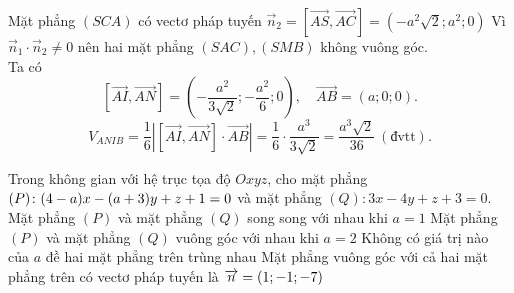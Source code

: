 \begin{ex}
{\begin{itemchoice}
			Mặt phẳng $(SCA)$ có vectơ pháp  tuyến $\overrightarrow{n}_2 = [\overrightarrow{AS},\overrightarrow{AC}] = (-a^2\sqrt{2};a^2;0)$
			\itemch Vì  $\overrightarrow{n}_1 \cdot \overrightarrow{n}_2 \ne 0$ nên hai mặt phẳng $(SAC), (SMB)$ không vuông góc.\\
			 Ta có
			 $$
			\left[\overrightarrow{AI},\overrightarrow{AN}\right] = \left( -\dfrac{a^2}{3\sqrt{2}}; -\dfrac{a^2}{6};0 \right),\quad \overrightarrow{AB} = (a;0;0). 
			 $$
			$$ 
			V_{ANIB} = \dfrac{1}{6} \left| [\overrightarrow{AI},\overrightarrow{AN}] \cdot \overrightarrow{AB} \right| = \dfrac{1}{6} \cdot  \dfrac{a^3}{3\sqrt{2}} = \dfrac{a^3\sqrt{2}}{36}\ (\text{đvtt}).
			 $$
		\end{itemchoice}
	} 
\end{ex}

\begin{ex}%
	Trong không gian với hệ  trục tọa độ $Oxyz$, cho mặt phẳng \break $(P)\colon\break(4-a)x-(a+3)y+z+1=0$ và mặt phẳng $(Q)\colon3 x-4 y+z+3=0$.
	\choiceTF 
		{\True  Mặt phẳng $(P)$ và mặt phẳng $(Q)$ song song với nhau khi $a=1$}
		{Mặt phẳng $(P)$ và  mặt phẳng $(Q)$ vuông góc với nhau khi $a=2$}
		{\True Không có giá trị nào của $a$ đề  hai mặt phẳng trên trùng nhau}
		{\True Mặt phẳng vuông góc với cả hai mặt phẳng trên có vectơ  pháp tuyến là $\break \overrightarrow{n}=(1;-1;-7)$}
\end{ex}

